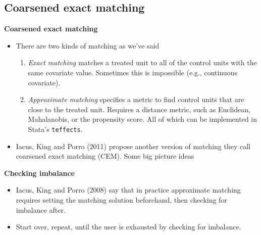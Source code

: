 \documentclass[notes=show]{beamer}
\begin{document}
\subsection{Coarsened exact matching}



\begin{frame}
	\begin{center}
	\textbf{Coarsened exact matching}
	\end{center}

	
\begin{itemize}
\item There are two kinds of matching as we've said
	\begin{enumerate}
	\item \emph{Exact matching} matches a treated unit to all of the control units with the same covariate value. Sometimes this is impossible (e.g., continuous covariate). 
	\item \emph{Approximate matching} specifies a metric to find control units that are close to the treated unit. Requires a distance metric, such as Euclidean, Mahalanobis, or the propensity score.  All of which can be implemented in Stata's \texttt{teffects}.
	\end{enumerate}
\item 	Iacus, King and Porro (2011) propose another version of matching they call coarsened exact matching (CEM). Some big picture ideas
\end{itemize}
\end{frame}

\begin{frame}[plain]
\begin{center}
\textbf{Checking imbalance}
\end{center}

\begin{itemize}
\item Iacus, King and Porro (2008) say that in practice approximate matching requires setting the matching solution beforehand, then checking for imbalance after.  
\item Start over, repeat, until the user is exhausted by checking for imbalance.
\end{itemize}

\end{frame}
\end{document}
